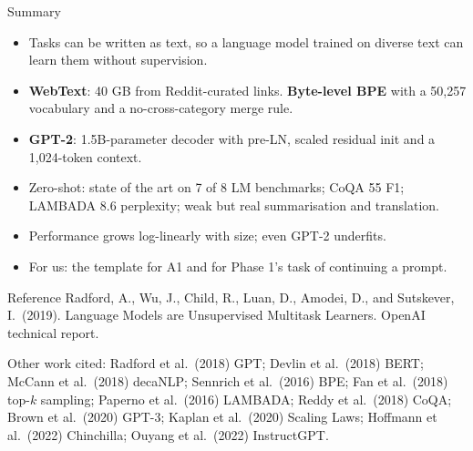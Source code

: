 \documentclass[aspectratio=169,11pt]{beamer}
\begin{document}
\begin{frame}{Summary}
  \begin{itemize}
    \item Tasks can be written as text, so a language model trained on diverse text can learn them without supervision.
    \item \textbf{WebText}: 40 GB from Reddit-curated links. \textbf{Byte-level BPE} with a 50,257 vocabulary and a no-cross-category merge rule.
    \item \textbf{GPT-2}: 1.5B-parameter decoder with pre-LN, scaled residual init and a 1,024-token context.
    \item Zero-shot: state of the art on 7 of 8 LM benchmarks; CoQA 55 F1; LAMBADA 8.6 perplexity; weak but real summarisation and translation.
    \item Performance grows log-linearly with size; even GPT-2 underfits.
    \item For us: the template for A1 and for Phase 1's task of continuing a prompt.
  \end{itemize}
\end{frame}

\begin{frame}{Reference}
  \small
  Radford, A., Wu, J., Child, R., Luan, D., Amodei, D., and Sutskever, I.\ (2019). Language Models are Unsupervised Multitask Learners. OpenAI technical report.
  \vspace{3mm}

  {\footnotesize Other work cited: Radford et al.\ (2018) GPT; Devlin et al.\ (2018) BERT; McCann et al.\ (2018) decaNLP; Sennrich et al.\ (2016) BPE; Fan et al.\ (2018) top-$k$ sampling; Paperno et al.\ (2016) LAMBADA; Reddy et al.\ (2018) CoQA; Brown et al.\ (2020) GPT-3; Kaplan et al.\ (2020) Scaling Laws; Hoffmann et al.\ (2022) Chinchilla; Ouyang et al.\ (2022) InstructGPT.}
\end{frame}
\end{document}
